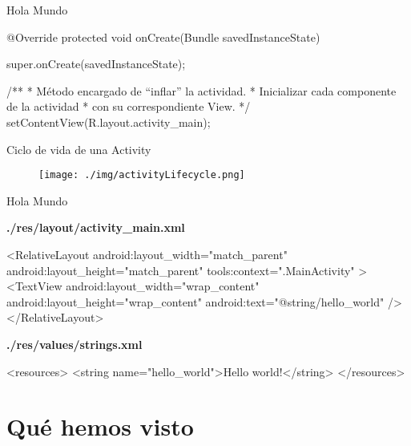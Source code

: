 \begin{frame}[fragile]{Hola Mundo}
\begin{block}{}
\begin{javacode}
    @Override
    protected void onCreate(Bundle savedInstanceState) {
        super.onCreate(savedInstanceState);

        /**
         * Método encargado de “inflar” la actividad.
         * Inicializar cada componente de la actividad
         * con su correspondiente View.
         */
        setContentView(R.layout.activity_main);
    }
\end{javacode}
\end{block}
\end{frame}

\begin{frame}{Ciclo de vida de una Activity}
\begin{block}{}
\begin{figure}[H]
\centering
\texttt{[image: ./img/activityLifecycle.png]}
\end{figure}
\end{block}
\end{frame}

\begin{frame}[fragile]{Hola Mundo}
\begin{block}{}
\textbf{./res/layout/activity\_main.xml}
\begin{xmlcode}
<RelativeLayout
    android:layout_width="match_parent"
    android:layout_height="match_parent"
    tools:context=".MainActivity" >
    <TextView
        android:layout_width="wrap_content"
        android:layout_height="wrap_content"
        android:text="@string/hello_world" />
</RelativeLayout>
\end{xmlcode}
\textbf{./res/values/strings.xml}
\begin{xmlcode}
<resources>
    <string name="hello_world">Hello world!</string>
</resources>
\end{xmlcode}
\end{block}
\end{frame}
\section*{Qué hemos visto}

